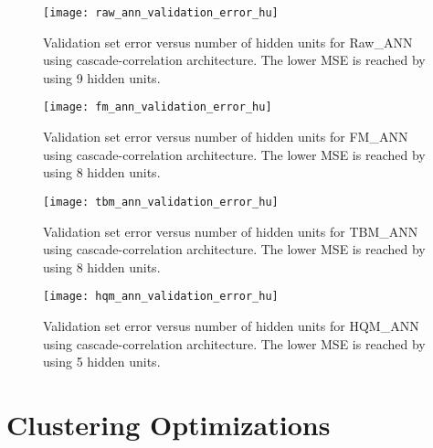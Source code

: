 \begin{figure}[H]
	\begin{center}
		\texttt{[image: raw\_ann\_validation\_error\_hu]}
		\caption[Validation set error versus number of hidden units for Raw\_ANN using ca\-sca\-de-\-cor\-re\-la\-tion architecture]{Validation set error versus number of hidden units for Raw\_ANN using ca\-sca\-de-\-cor\-re\-la\-tion architecture. The lower MSE is reached by using 9 hidden units.}
		\label{fig:raw_ann_validation_error_hu}
	\end{center}
\end{figure}
\begin{figure}[H]
	\begin{center}
		\texttt{[image: fm\_ann\_validation\_error\_hu]}
		\caption[Validation set error versus number of hidden units for FM\_ANN using ca\-sca\-de-\-cor\-re\-la\-tion architecture]{Validation set error versus number of hidden units for FM\_ANN using ca\-sca\-de-\-cor\-re\-la\-tion architecture. The lower MSE is reached by using 8 hidden units.}
		\label{fig:fm_ann_validation_error_hu}
	\end{center}
\end{figure}
\begin{figure}[H]
	\begin{center}
		\texttt{[image: tbm\_ann\_validation\_error\_hu]}
		\caption[Validation set error versus number of hidden units for TBM\_ANN using ca\-sca\-de-\-cor\-re\-la\-tion architecture]{Validation set error versus number of hidden units for TBM\_ANN using ca\-sca\-de-\-cor\-re\-la\-tion architecture. The lower MSE is reached by using 8 hidden units.}
		\label{fig:tbm_ann_validation_error_hu}
	\end{center}
\end{figure}
\begin{figure}[H]
	\begin{center}
		\texttt{[image: hqm\_ann\_validation\_error\_hu]}
		\caption[Validation set error versus number of hidden units for HQM\_ANN using ca\-sca\-de-\-cor\-re\-la\-tion architecture]{Validation set error versus number of hidden units for HQM\_ANN using ca\-sca\-de-\-cor\-re\-la\-tion architecture. The lower MSE is reached by using 5 hidden units.}
		\label{fig:hqm_ann_validation_error_hu}
	\end{center}
\end{figure}



\section{Clustering Optimizations}
\label{sec:clustering_optimization}

